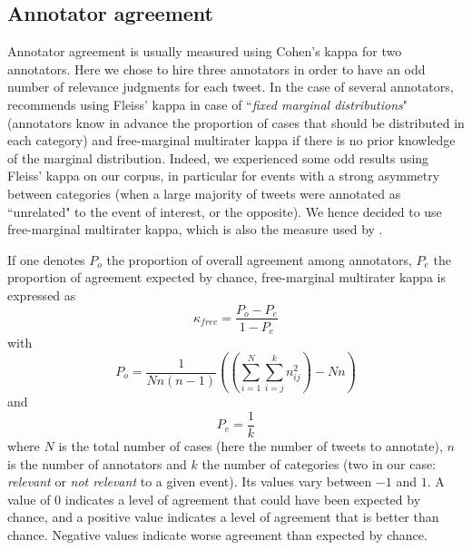 	\subsection{Annotator agreement}

Annotator agreement is usually measured using Cohen's kappa for two annotators. Here we chose to hire three annotators in order to have an odd number of relevance judgments for each tweet. In the case of several annotators, \citet{randolph_free_2005} recommends using Fleiss' kappa \citep{fleiss_measuring_1971} in case of ``\textit{fixed marginal distributions}" (annotators know in advance the proportion of cases that should be distributed in each category) and free-marginal multirater kappa \citep{randolph_free_2005} if there is no prior knowledge of the marginal distribution. Indeed, we experienced some odd results using Fleiss' kappa on our corpus, in particular for events with a strong asymmetry between categories (when a large majority of tweets were annotated as ``unrelated" to the event of interest, or the opposite). We hence decided to use free-marginal multirater kappa, which is also the measure used by \citet{mcminn_building_2013}.


If one denotes $P_o$ the proportion of overall agreement among annotators, $P_e$ the proportion of agreement expected by chance, free-marginal multirater kappa is expressed as 
$$
\kappa_{free} = \frac{P_o - P_e}{1 - P_e}
$$
with 
$$
P_o = \frac{1}{Nn(n-1)}((\sum_{i=1}^N\sum_{i=j}^kn_{ij}^2)-Nn)
$$
and
$$
P_e = \frac{1}{k}
$$
where $N$ is the total number of cases (here the number of tweets to annotate), $n$ is the number of annotators and $k$ the number of categories (two in our case: \textit{relevant} or \textit{not relevant} to a given event). Its values vary between $-1$ and $1$. A value of $0$ indicates a level of agreement that could have been expected by chance, and a positive value indicates a level of agreement that is better than chance. Negative values indicate worse agreement than expected by chance.


